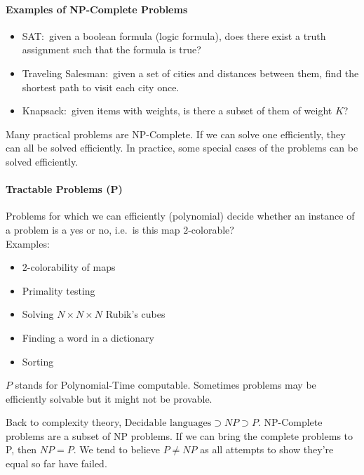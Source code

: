 \documentclass[12 pt]{article}
\begin{document}
\paragraph{Examples of NP-Complete Problems}
\begin{itemize}
\item SAT:\ given a boolean formula (logic formula), does there exist
  a truth assignment such that the formula is true?
\item Traveling Salesman:\ given a set of cities and distances between
  them, find the shortest path to visit each city once.
\item Knapsack:\ given items with weights, is there a subset of them
  of weight $K$?
\end{itemize}
Many practical problems are NP-Complete. If we can solve one
efficiently, they can all be solved efficiently. In practice, some
special cases of the problems can be solved efficiently.
\paragraph{Tractable Problems (P)} Problems for which we can
efficiently (polynomial) decide whether an instance of a problem is a
yes or no, i.e.\ is this map $2$-colorable?
\\ Examples:
\begin{itemize}
\item $2$-colorability of maps
\item Primality testing
\item Solving $N \times N \times N$ Rubik's cubes
\item Finding a word in a dictionary
\item Sorting
\end{itemize}
$P$ stands for Polynomial-Time computable. Sometimes problems may be
efficiently solvable but it might not be provable.

Back to complexity theory, $\text{Decidable languages} \supset NP
\supset P$. NP-Complete problems are a subset of NP problems. If we
can bring the complete problems to P, then $NP = P$. We tend to
believe $P \neq NP$ as all attempts to show they're equal so far have
failed.
\end{document}
